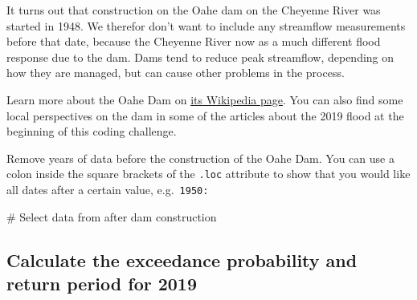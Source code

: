 \documentclass[
  letterpaper,
  DIV=11,
  numbers=noendperiod,
  oneside]{scrreprt}
\newenvironment{Shaded}{\begin{snugshade}}{\end{snugshade}}
\newcommand{\CommentTok}[1]{\textcolor[rgb]{0.37,0.37,0.37}{#1}}
\begin{document}
It turns out that construction on the Oahe dam on the Cheyenne River was
started in 1948. We therefor don't want to include any streamflow
measurements before that date, because the Cheyenne River now as a much
different flood response due to the dam. Dams tend to reduce peak
streamflow, depending on how they are managed, but can cause other
problems in the process.

\begin{tcolorbox}[enhanced jigsaw, colbacktitle=quarto-callout-color!10!white, opacityback=0, bottomtitle=1mm, toptitle=1mm, bottomrule=.15mm, left=2mm, colframe=quarto-callout-color-frame, leftrule=.75mm, opacitybacktitle=0.6, colback=white, rightrule=.15mm, toprule=.15mm, breakable, titlerule=0mm, title=\textcolor{quarto-callout-color}{\faInfo}\hspace{0.5em}{Read More}, coltitle=black, arc=.35mm]

Learn more about the Oahe Dam on
\href{https://en.wikipedia.org/wiki/Oahe_Dam}{its Wikipedia page}. You
can also find some local perspectives on the dam in some of the articles
about the 2019 flood at the beginning of this coding challenge.

\end{tcolorbox}

\begin{tcolorbox}[enhanced jigsaw, colbacktitle=quarto-callout-color!10!white, opacityback=0, bottomtitle=1mm, toptitle=1mm, bottomrule=.15mm, left=2mm, colframe=quarto-callout-color-frame, leftrule=.75mm, opacitybacktitle=0.6, colback=white, rightrule=.15mm, toprule=.15mm, breakable, titlerule=0mm, title=\textcolor{quarto-callout-color}{\faInfo}\hspace{0.5em}{Try It}, coltitle=black, arc=.35mm]

Remove years of data before the construction of the Oahe Dam. You can
use a colon inside the square brackets of the \texttt{.loc} attribute to
show that you would like all dates after a certain value,
e.g.~\texttt{\textquotesingle{}1950\textquotesingle{}:}

\end{tcolorbox}

\begin{Shaded}
\begin{Highlighting}[]
\CommentTok{\# Select data from after dam construction}
\end{Highlighting}
\end{Shaded}

\subsection{Calculate the exceedance probability and return period for
2019}\label{calculate-the-exceedance-probability-and-return-period-for-2019}
\end{document}

